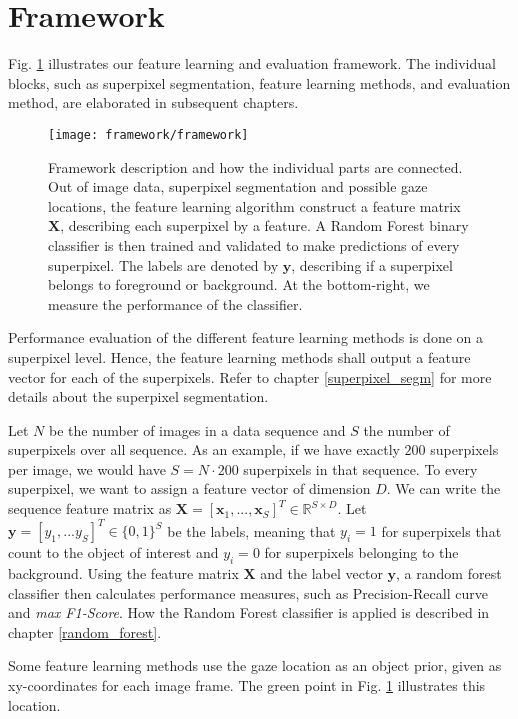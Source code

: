 \section{Framework} \label{framework}
Fig. \ref{fig:Framework} illustrates our feature learning and evaluation framework. The individual blocks, such as superpixel segmentation, feature learning methods, and evaluation method, are elaborated in subsequent chapters. 

\begin{figure}[!htpb]
  \centering
  \texttt{[image: framework/framework]}
  \caption[Framework description]{Framework description and how the individual parts are connected. Out of image data, superpixel segmentation and possible gaze locations, the feature learning algorithm construct a feature matrix $\boldsymbol{X}$, describing each superpixel by a feature. A Random Forest binary classifier is then trained and validated to make predictions of every superpixel. The labels are denoted by $\boldsymbol{y}$, describing if a superpixel belongs to foreground or background. At the bottom-right, we measure the performance of the classifier.}
  \label{fig:Framework}
\end{figure}

Performance evaluation of the different feature learning methods is done on a superpixel level. Hence, the feature learning methods shall output a feature vector for each of the superpixels. Refer to chapter \ref{superpixel_segm} for more details about the superpixel segmentation.

Let $N$ be the number of images in a data sequence and $S$ the number of superpixels over all sequence. As an example, if we have exactly $200$ superpixels per image, we would have $S=N \cdot 200$ superpixels in that sequence. To every superpixel, we want to assign a feature vector of dimension $D$. We can write the sequence feature matrix as $\boldsymbol{X} = [\boldsymbol{x}_1,...,\boldsymbol{x}_S]^T \in \mathbb{R}^{S \times D}$. Let $\boldsymbol{y} = [y_1,...y_S]^T \in \{0,1\}^S$ be the labels, meaning that $y_i=1$ for superpixels that count to the object of interest and $y_i=0$ for superpixels belonging to the background. Using the feature matrix $\boldsymbol{X}$ and the label vector $\boldsymbol{y}$, a random forest classifier then calculates performance measures, such as Precision-Recall curve and \textit{max F1-Score}. How the Random Forest classifier is applied is described in chapter \ref{random_forest}.

Some feature learning methods use the gaze location as an object prior, given as xy-coordinates for each image frame. The green point in Fig. \ref{fig:Framework} illustrates this location.

